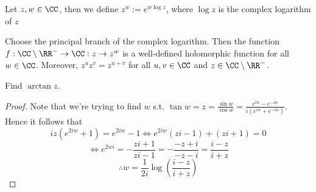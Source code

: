 \begin{definition}
  Let $z,w\in\CC$, then we define $z^w:= e^{w\log z}$, where $\log z$ is the
  complex logarithm of $z$
\end{definition}
\begin{lemma}
  Choose the principal branch of the complex logarithm. Then the function
  $f:\CC\setminus\RR^- \to \CC:z\to z^w$ is a well-defined holomorphic
  function for all $w\in\CC$. Moreover, $z^uz^v=z^{u+v}$ for all $u,v\in\CC$ and
  $z\in\CC\setminus\RR^-$.
\end{lemma}

\begin{exercise}
  Find $\arctan z$.
\end{exercise}
\begin{proof}
  Note that we're trying to find $w$ s.t. $\tan w =z=\frac{\sin w}{\cos w} =
  \frac{e^{iw}-e^{-iw}}{i(e^{iw}+e^{-iw})}$. Hence it follows that 
  \[iz(e^{2iw}+1)=e^{2iw}-1 \iff e^{2iw}(zi-1)+(zi+1)=0\]
  \[\iff e^{2wi} = -\frac{zi+1}{zi-1}= -\frac{-z+i}{-z-i}=\frac{i-z}{i+z}\]
  \[\therefore w= \frac{1}{2i}\log\left( \frac{i-z}{i+z} \right)\]
\end{proof}

